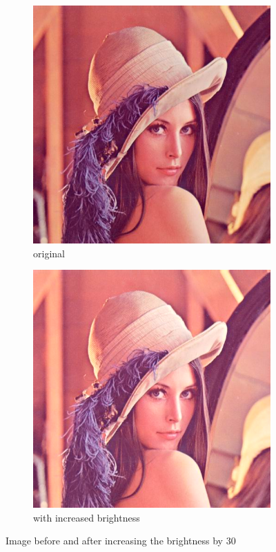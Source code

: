 \documentclass[12pt]{article}
\begin{document}
\begin{figure}[H]\centering
    \begin{subfigure}[t]{\subfiguresize}\centering
        \includegraphics[width=\textwidth]{lenac.png}
        \caption{original}
    \end{subfigure}
    \hspace{.05\textwidth}
    \begin{subfigure}[t]{\subfiguresize}\centering
        \includegraphics[width=\textwidth]{lenac_bright+30.png}
        \caption{with increased brightness}
    \end{subfigure}
    \caption{Image before and after increasing the brightness by 30}
\end{figure}
\end{document}
